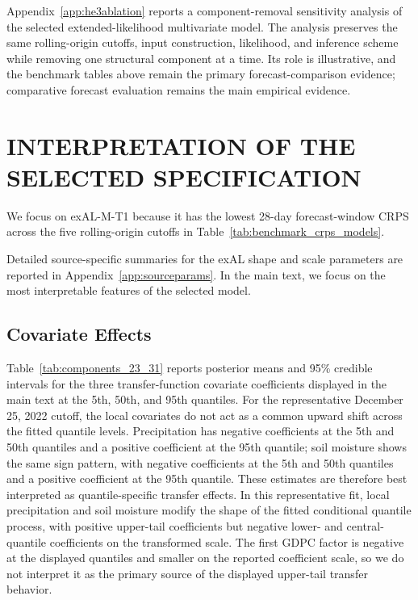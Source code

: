 \documentclass[APA,STIX1COL]{WileyNJD-v2}
\begin{document}



Appendix~\ref{app:he3ablation} reports a component-removal sensitivity analysis of the selected extended-likelihood multivariate model. The analysis preserves the same rolling-origin cutoffs, input construction, likelihood, and inference scheme while removing one structural component at a time. Its role is illustrative, and the benchmark tables above remain the primary forecast-comparison evidence; comparative forecast evaluation remains the main empirical evidence.

\section{INTERPRETATION OF THE SELECTED SPECIFICATION}
\label{sec:interpretation}

We focus on exAL-M-T1 because it has the lowest 28-day forecast-window CRPS across the five rolling-origin cutoffs in Table~\ref{tab:benchmark_crps_models}.

Detailed source-specific summaries for the exAL shape and scale parameters are reported in Appendix~\ref{app:sourceparams}. In the main text, we focus on the most interpretable features of the selected model.

\subsection{Covariate Effects}



Table~\ref{tab:components_23_31} reports posterior means and 95\% credible intervals for the three transfer-function covariate coefficients displayed in the main text at the 5th, 50th, and 95th quantiles. For the representative December 25, 2022 cutoff, the local covariates do not act as a common upward shift across the fitted quantile levels. Precipitation has negative coefficients at the 5th and 50th quantiles and a positive coefficient at the 95th quantile; soil moisture shows the same sign pattern, with negative coefficients at the 5th and 50th quantiles and a positive coefficient at the 95th quantile.
These estimates are therefore best interpreted as quantile-specific transfer effects. In this representative fit, local precipitation and soil moisture modify the shape of the fitted conditional quantile process, with positive upper-tail coefficients but negative lower- and central-quantile coefficients on the transformed scale. The first GDPC factor is negative at the displayed quantiles and smaller on the reported coefficient scale, so we do not interpret it as the primary source of the displayed upper-tail transfer behavior.
\end{document}
